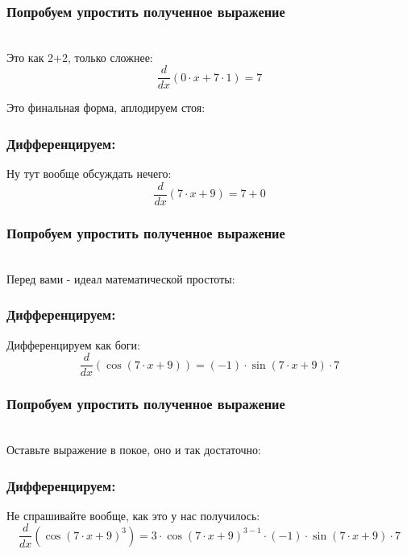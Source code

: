 \documentclass[a4paper,12pt]{article}
\begin{document}
\subsubsection*{Попробуем упростить полученное выражение}
\\Это как 2+2, только сложнее:\\
\begin{dmath}
	\frac{d}{dx}\left(0\cdot x+ 7\cdot 1\right) = 7\end{dmath}

Это финальная форма, аплодируем стоя:

\subsubsection*{Дифференцируем:}

Ну тут вообще обсуждать нечего:
\begin{dmath}\frac{d}{dx}\left(7\cdot x+ 9\right)=7+ 0\end{dmath}
\subsubsection*{Попробуем упростить полученное выражение}
\\Перед вами - идеал математической простоты:

\subsubsection*{Дифференцируем:}

Дифференцируем как боги:
\begin{dmath}\frac{d}{dx}\left(\operatorname{cos}\left(7\cdot x+ 9\right) \right)=(-1)\cdot \operatorname{sin}\left(7\cdot x+ 9\right) \cdot 7\end{dmath}
\subsubsection*{Попробуем упростить полученное выражение}
\\Оставьте выражение в покое, оно и так достаточно:

\subsubsection*{Дифференцируем:}

Не спрашивайте вообще, как это у нас получилось:
\begin{dmath}\frac{d}{dx}\left(\operatorname{cos}\left(7\cdot x+ 9\right) ^{3}\right)=3\cdot \operatorname{cos}\left(7\cdot x+ 9\right) ^{3- 1}\cdot (-1)\cdot \operatorname{sin}\left(7\cdot x+ 9\right) \cdot 7\end{dmath}
\end{document}
